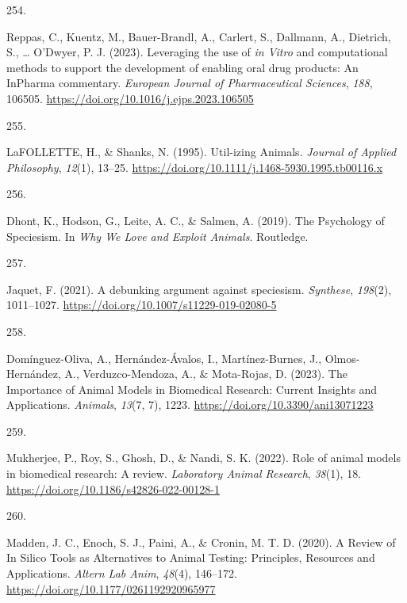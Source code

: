 \documentclass[
  11pt,
  letterpaper,
]{scrreprt}
\newlength{\cslhangindent}
\newlength{\csllabelwidth}
\newenvironment{CSLReferences}[2] %
 {\begin{list}{}{%
  \setlength{\itemindent}{0pt}
  \setlength{\leftmargin}{0pt}
  \setlength{\parsep}{0pt}
  \ifodd #1
   \setlength{\leftmargin}{\cslhangindent}
   \setlength{\itemindent}{-1\cslhangindent}
  \fi
  \setlength{\itemsep}{#2\baselineskip}}}
 {\end{list}}
\newcommand{\CSLLeftMargin}[1]{\parbox[t]{\csllabelwidth}{\strut#1\strut}}
\newcommand{\CSLRightInline}[1]{\parbox[t]{\linewidth - \csllabelwidth}{\strut#1\strut}}
\begin{document}
\begin{CSLReferences}{0}{0}
\CSLLeftMargin{254. }%
\CSLRightInline{Reppas, C., Kuentz, M., Bauer-Brandl, A., Carlert, S.,
Dallmann, A., Dietrich, S., \ldots{} O'Dwyer, P. J. (2023). Leveraging
the use of {\emph{in Vitro}} and computational methods to support the
development of enabling oral drug products: {An InPharma} commentary.
\emph{European Journal of Pharmaceutical Sciences}, \emph{188}, 106505.
\url{https://doi.org/10.1016/j.ejps.2023.106505}}

\CSLLeftMargin{255. }%
\CSLRightInline{LaFOLLETTE, H., \& Shanks, N. (1995). Util-izing
{Animals}. \emph{Journal of Applied Philosophy}, \emph{12}(1), 13--25.
\url{https://doi.org/10.1111/j.1468-5930.1995.tb00116.x}}

\CSLLeftMargin{256. }%
\CSLRightInline{Dhont, K., Hodson, G., Leite, A. C., \& Salmen, A.
(2019). The {Psychology} of {Speciesism}. In \emph{Why {We Love} and
{Exploit Animals}}. Routledge.}

\CSLLeftMargin{257. }%
\CSLRightInline{Jaquet, F. (2021). A debunking argument against
speciesism. \emph{Synthese}, \emph{198}(2), 1011--1027.
\url{https://doi.org/10.1007/s11229-019-02080-5}}

\CSLLeftMargin{258. }%
\CSLRightInline{Domínguez-Oliva, A., Hernández-Ávalos, I.,
Martínez-Burnes, J., Olmos-Hernández, A., Verduzco-Mendoza, A., \&
Mota-Rojas, D. (2023). The {Importance} of {Animal Models} in
{Biomedical Research}: {Current Insights} and {Applications}.
\emph{Animals}, \emph{13}(7, 7), 1223.
\url{https://doi.org/10.3390/ani13071223}}

\CSLLeftMargin{259. }%
\CSLRightInline{Mukherjee, P., Roy, S., Ghosh, D., \& Nandi, S. K.
(2022). Role of animal models in biomedical research: A review.
\emph{Laboratory Animal Research}, \emph{38}(1), 18.
\url{https://doi.org/10.1186/s42826-022-00128-1}}

\CSLLeftMargin{260. }%
\CSLRightInline{Madden, J. C., Enoch, S. J., Paini, A., \& Cronin, M. T.
D. (2020). A {Review} of {In Silico Tools} as {Alternatives} to {Animal
Testing}: {Principles}, {Resources} and {Applications}. \emph{Altern Lab
Anim}, \emph{48}(4), 146--172.
\url{https://doi.org/10.1177/0261192920965977}}


\end{CSLReferences}
\end{document}

